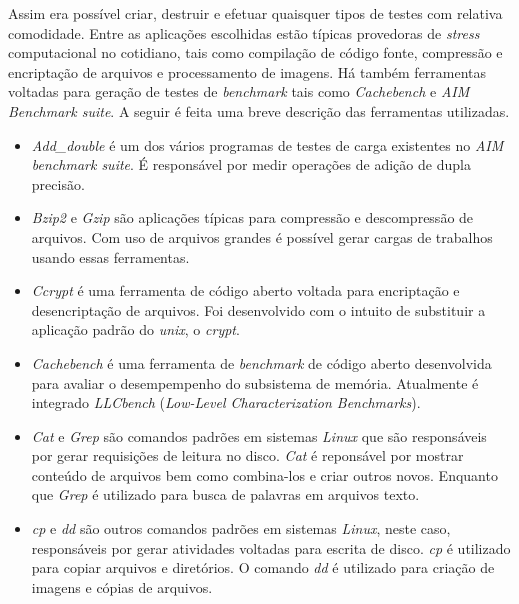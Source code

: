 Assim era possível criar, destruir e efetuar quaisquer tipos de testes com relativa comodidade. Entre as aplicações escolhidas estão típicas provedoras de \textit{stress} computacional no cotidiano, tais como compilação de código fonte, compressão e encriptação de arquivos e processamento de imagens. Há também ferramentas voltadas para geração de testes de \textit{benchmark} tais como \textit{Cachebench} e \textit{AIM Benchmark suite}. A seguir é feita uma breve descrição das ferramentas utilizadas.

\begin{itemize}
\item \textit{Add\_double} \footnotemark[5]                                                                                                                               é um dos vários programas de testes de carga existentes no \textit{AIM benchmark suite}. É responsável por medir operações de adição de dupla precisão.

\item \textit{Bzip2} \footnotemark[6] e \textit{Gzip} \footnotemark[7] são aplicações típicas para compressão e descompressão de arquivos. Com uso de arquivos grandes é possível gerar cargas de trabalhos usando essas ferramentas.

\item \textit{Ccrypt} \footnotemark[8] é uma ferramenta de código aberto voltada para encriptação e desencriptação de arquivos. Foi desenvolvido com o intuito de substituir a aplicação padrão do \textit{unix}, o \textit{crypt}.

\item \textit{Cachebench} \footnotemark[9] é uma ferramenta de \textit{benchmark} de código aberto desenvolvida para avaliar o desempempenho do subsistema de memória. Atualmente é integrado \textit{LLCbench} (\textit{Low-Level Characterization Benchmarks}).

\item \textit{Cat} e \textit{Grep} são comandos padrões em sistemas \textit{Linux} que são responsáveis por gerar requisições de leitura no disco. \textit{Cat} é reponsável por mostrar conteúdo de arquivos bem como combina-los e criar outros novos. Enquanto que \textit{Grep} é utilizado para busca de palavras em arquivos texto.

\item \textit{cp} e \textit{dd} são outros comandos padrões em sistemas \textit{Linux}, neste caso, responsáveis por gerar atividades voltadas para escrita de disco. \textit{cp} é utilizado para copiar arquivos e diretórios. O comando \textit{dd} é utilizado para criação de imagens e cópias de arquivos.


\end{itemize}
